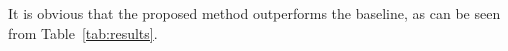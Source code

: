 It is obvious that the proposed method outperforms the baseline, as can be seen from Table~\ref{tab:results}.
